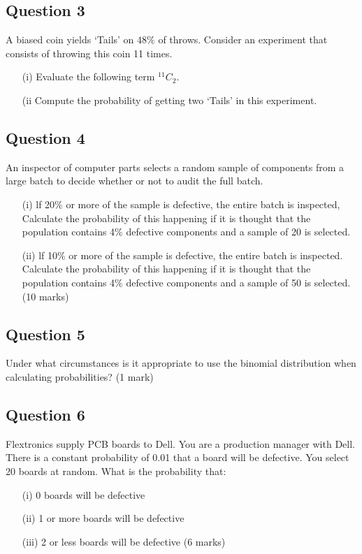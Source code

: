 \documentclass[]{report}
\begin{document}
	
\subsection*{Question 3}
A biased coin yields `Tails' on $48\%$ of throws. Consider an experiment that consists of throwing this coin 11 times.
\begin{itemize}
	\item[(i)] Evaluate the following term $^{11}C_2$.
	\item[(ii] Compute the probability of getting two `Tails' in this experiment.
\end{itemize}

\subsection*{Question 4}
An inspector of computer parts selects a random sample of components
from a large batch to decide whether or not to audit the full batch.

\begin{itemize}
	\item[(i)] lf 20\% or more of the sample is defective, the entire batch is
	inspected, Calculate the probability of this happening if it is
	thought that the population contains 4\% defective components and
	a sample of 20 is selected.
	\item[(ii)] lf 10\% or more of the sample is defective, the entire batch is
	inspected. Calculate the probability of this happening if it is
	thought that the population contains 4\% defective components and
	a sample of 50 is selected.
	(10 marks)
\end{itemize}


\subsection*{Question 5}
Under what circumstances is it appropriate to use the binomial distribution when calculating probabilities?					(1 mark)

\subsection*{Question 6}
Flextronics supply PCB boards to Dell.  You are a production manager with Dell.  There is a constant probability of 0.01 that a board will be defective.  You select 20 boards at random.  What is the probability that:
\begin{itemize}
	\item[(i)]	0 boards will be defective
	\item[(ii)]	1 or more boards will be defective
	\item[(iii)]	2 or less boards will be defective			
	(6 marks)
\end{itemize}
\end{document}
